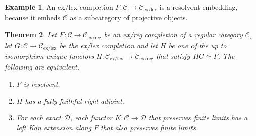\documentclass[sort&compress,draft]{elsarticle}
\theoremstyle{plain}
\newtheorem{theorem}{Theorem}
\theoremstyle{definition}
\newtheorem{example}[theorem]{Example}
\theoremstyle{remark}
\newcommand\hide[1]{}
\newcommand\cat\mathcal
\newcommand\exlex{_\mathrm{ex/lex}}\newcommand\exreg{_\mathrm{ex/reg}}
\newcommand\of:
\begin{document}
\begin{example} An ex/lex completion $F\of\cat C\to\cat C\exlex$ is a resolvent embedding, because it embeds $\cat C$ as a subcategory of projective objects. \hide{cite for both definitions and theorems} \end{example}


\begin{theorem} Let $F:\cat C\to\cat C\exreg$ be an ex/reg completion of a regular category $\cat C$, let $G\of \cat C \to \cat C\exlex$ be the ex/lex completion and let $H$ be one of the up to isomorphism unique functors $H\of\cat C\exlex \to \cat C\exreg$ that satisfy $HG\simeq F$. 
The following are equivalent.
\begin{enumerate}
\item $F$ is resolvent.
\item $H$ has a fully faithful right adjoint.
\item For each exact $\cat D$, each functor $K\of \cat C \to \cat D$ that preserves finite limits has a left Kan extension along $F$ that also preserves finite limits.
\end{enumerate}
\end{theorem}
\end{document}
